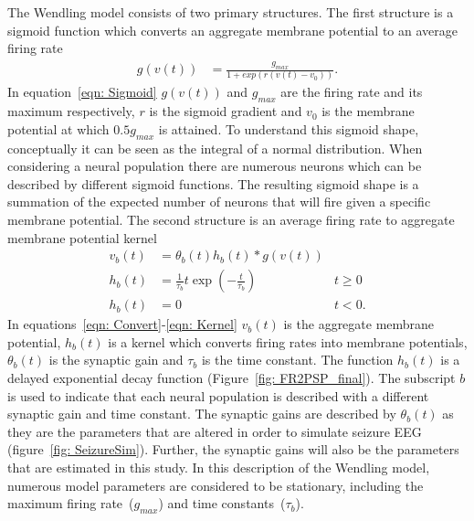 The Wendling model consists of two primary structures. The first structure is a sigmoid function which converts an aggregate membrane potential to an average firing rate\begin{align}%
\label{eqn: Sigmoid}
g(v(t)) &= \frac{g_{max}}{1+exp(r(v(t)-v_{0}))}. \end{align}  In equation~\ref{eqn: Sigmoid} $g(v(t))$ and $g_{max}$ are the firing rate and its maximum respectively, $r$ is the sigmoid gradient and $v_{0}$ is the membrane potential at which $0.5g_{max}$ is attained. To understand this sigmoid shape, conceptually it can be seen as the integral of a normal distribution. When considering a neural population there are numerous neurons which can be described by different sigmoid functions. The resulting sigmoid shape is a summation of the expected number of neurons that will fire given a specific membrane potential. %
The second structure is an average firing rate to aggregate membrane potential kernel \begin{align} %
\label{eqn: Convert}
v_{b}(t) &= \theta_{b}(t)h_{b}(t)*g(v(t))\\
\label{eqn: Kernel} 
h_{b}(t) &= \frac{1}{\tau_{b}}t\exp\left(-\frac{t}{\tau_{b}}\right) & t \geq 0\\
h_{b}(t) & = 0 & t <0. \end{align} In equations~\ref{eqn: Convert}-\ref{eqn: Kernel} $v_{b}(t)$ is the aggregate membrane potential, $h_{b}(t)$ is a kernel which converts firing rates into membrane potentials, $\theta_{b}(t)$ is the synaptic gain and $\tau_{b}$ is the time constant. The function $h_{b}(t)$ is a delayed exponential decay function (Figure~\ref{fig: FR2PSP_final}). The subscript $b$ is used to indicate that each neural population is described with a different synaptic gain and time constant. The synaptic gains are described by $\theta_{b}(t)$ as they are the parameters that are altered in order to simulate seizure EEG (figure~\ref{fig: SeizureSim}). Further, the synaptic gains will also be the parameters that are estimated in this study. In this description of the Wendling model, numerous model parameters are considered to be stationary, including the maximum firing rate~($g_{max}$) and time constants~($\tau_{b}$). 
